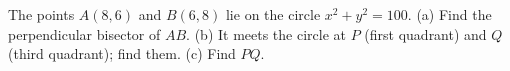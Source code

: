 The points $A(8,6)$ and $B(6,8)$ lie on the circle $x^2+y^2=100$. (a) Find the perpendicular bisector of $AB$. (b) It meets the circle at $P$ (first quadrant) and $Q$ (third quadrant); find them. (c) Find $PQ$.
